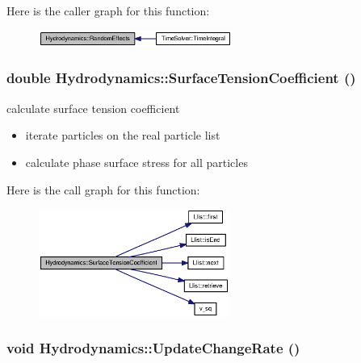 Here is the caller graph for this function:\nopagebreak
\begin{figure}[H]
\begin{center}
\leavevmode
\includegraphics[width=179pt]{classHydrodynamics_8f826d2003ca7a4782b028b761a26421_icgraph}
\end{center}
\end{figure}
\hypertarget{classHydrodynamics_e6983cf4d86bf7b33b88c8f089caf3a8}{
\subsubsection[{SurfaceTensionCoefficient}]{\setlength{\rightskip}{0pt plus 5cm}double Hydrodynamics::SurfaceTensionCoefficient ()}}
\label{classHydrodynamics_e6983cf4d86bf7b33b88c8f089caf3a8}


calculate surface tension coefficient 



\begin{itemize}
\item iterate particles on the real particle list\end{itemize}


\begin{itemize}
\item calculate phase surface stress for all particles \end{itemize}


Here is the call graph for this function:\nopagebreak
\begin{figure}[H]
\begin{center}
\leavevmode
\includegraphics[width=177pt]{classHydrodynamics_e6983cf4d86bf7b33b88c8f089caf3a8_cgraph}
\end{center}
\end{figure}
\hypertarget{classHydrodynamics_f744ee07f3f3b511d0db18949160c20a}{
\subsubsection[{UpdateChangeRate}]{\setlength{\rightskip}{0pt plus 5cm}void Hydrodynamics::UpdateChangeRate ()}}
\label{classHydrodynamics_f744ee07f3f3b511d0db18949160c20a}


